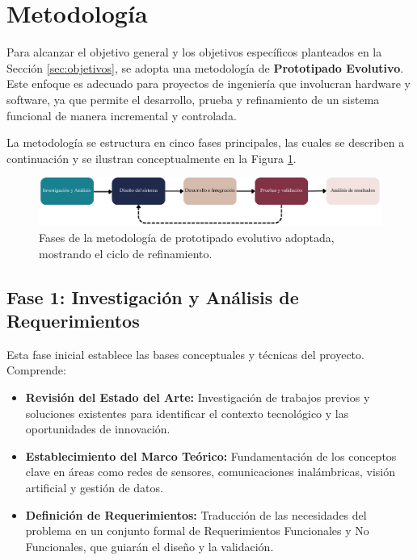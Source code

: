 
\section{Metodología}
\label{sec:metodologia} 

Para alcanzar el objetivo general y los objetivos específicos planteados en la Sección \ref{sec:objetivos}, se adopta una metodología de \textbf{Prototipado Evolutivo}. Este enfoque es adecuado para proyectos de ingeniería que involucran hardware y software, ya que permite el desarrollo, prueba y refinamiento de un sistema funcional de manera incremental y controlada.

La metodología se estructura en cinco fases principales, las cuales se describen a continuación y se ilustran conceptualmente en la Figura \ref{fig:fases_metodologia}.

\begin{figure}[h!]
    \centering
    \includegraphics[width=0.9\linewidth]{Documento/Imagenes/Metodologia/fases_proyecto.pdf} %
    \caption{Fases de la metodología de prototipado evolutivo adoptada, mostrando el ciclo de refinamiento.}
    \label{fig:fases_metodologia}
\end{figure}

\subsection{Fase 1: Investigación y Análisis de Requerimientos} %
\label{subsec:met_fase1} %
Esta fase inicial establece las bases conceptuales y técnicas del proyecto. Comprende:
\begin{itemize}
    \item \textbf{Revisión del Estado del Arte:} Investigación de trabajos previos y soluciones existentes para identificar el contexto tecnológico y las oportunidades de innovación.
    \item \textbf{Establecimiento del Marco Teórico:} Fundamentación de los conceptos clave en áreas como redes de sensores, comunicaciones inalámbricas, visión artificial y gestión de datos.
    \item \textbf{Definición de Requerimientos:} Traducción de las necesidades del problema en un conjunto formal de Requerimientos Funcionales y No Funcionales, que guiarán el diseño y la validación.
\end{itemize}

